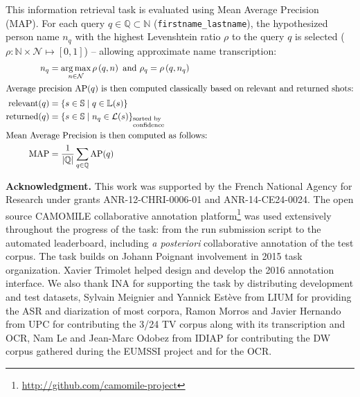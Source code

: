 \documentclass{acm_proc_article-me}
\newcommand\queries{\mathbb{Q}}
\newcommand\refLabels{\mathbb{L}}
\newcommand\refNames{\mathbb{N}}
\newcommand\shots{\mathbb{S}}
\newcommand\hypLabels{\mathcal{L}}
\newcommand\hypNames{\mathcal{N}}
\newcommand\ratio{\rho}
\DeclareMathOperator*{\argmax}{arg\,max}
\begin{document}
This information retrieval task is evaluated using Mean Average Precision (MAP).
For each query $q \in \queries \subset \refNames$ (\texttt{first\-name\_lastname}), the hypothesized person name $n_q$ with the highest Levenshtein ratio $\rho$ to the query $q$ is selected ($\ratio : \refNames \times \hypNames \mapsto [0, 1]$) -- allowing approximate name transcription:
\begin{align}
\displaystyle n_q & = \argmax_{n \in \hypNames} \rho\left(q, n \right) \text{ and } \rho_q = \rho\left(q, n_q \right) \nonumber \\
\intertext{Average precision $\text{AP}(q)$ is then computed classically based on relevant and returned shots:}
\text{relevant}(q) & = \{ s \in \shots \;|\; q \in \refLabels(s) \} \nonumber \\
\text{returned}(q) & = {\{ s \in \shots \;|\; n_q \in \hypLabels(s) \}}_{\begin{subarray}{l}\text{sorted by}\\
    \text{confidence}\end{subarray}} \nonumber \\
\intertext{Mean Average Precision is then computed as follows:}
            \text{MAP} & = \frac{1}{|\queries|} \sum_{q \in \queries} \text{AP}(q) \nonumber
\end{align}

\noindent\textbf{Acknowledgment.} This work was supported by the French National Agency for Research under grants ANR-12-CHRI-0006-01 and ANR-14-CE24-0024. The open source CAMO\-MILE collaborative annotation platform\footnote{\url{http://github.com/camomile-project}} was used extensively throughout the progress of the task: from the run submission script to the automated leaderboard, including \emph{a posteriori} collaborative annotation of the test corpus.
The task builds on Johann Poignant involvement in 2015 task organization.
Xavier Trimolet helped design and develop the 2016 annotation interface.
We also thank INA for supporting the task by distributing development and test datasets, Sylvain Meignier and Yannick Est\`eve from LIUM for providing the ASR and diarization of most corpora, Ramon Morros and Javier Hernando from UPC for contributing the 3/24 TV corpus along with its transcription and OCR, Nam Le and Jean-Marc Odobez from IDIAP for contributing the DW corpus gathered during the EUMSSI project and for the OCR.

\newpage



\end{document}
